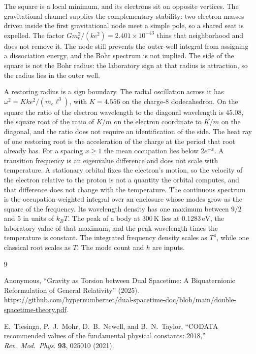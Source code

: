 \documentclass[a4paper]{article}
\begin{document}
The square is a local minimum, and its electrons sit on opposite vertices. The gravitational channel supplies the complementary stability: two electron masses driven inside the first gravitational node meet a simple pole, so a shared seat is expelled. The factor \(G m_e^{2}/(k e^{2})=2.401\times 10^{-43}\) thins that neighborhood and does not remove it. The node still prevents the outer-well integral from assigning a dissociation energy, and the Bohr spectrum is not implied. The side of the square is not the Bohr radius: the laboratory sign at that radius is attraction, so the radius lies in the outer well.

A restoring radius is a sign boundary. The radial oscillation across it has \(\omega^{2}=K k e^{2}/(m_e\ell^{3})\), with \(K=4.556\) on the charge-\(8\) dodecahedron. On the square the ratio of the electron wavelength to the diagonal wavelength is \(45.08\), the square root of the ratio of \(K/m\) on the electron coordinate to \(K/m\) on the diagonal, and the ratio does not require an identification of the side. The heat ray of one restoring root is the acceleration of the charge at the period that root already has. For a spacing \(x\ge 1\) the mean occupation lies below \(2e^{-x}\). A transition frequency is an eigenvalue difference and does not scale with temperature. A stationary orbital fixes the electron's motion, so the velocity of the electron relative to the proton is not a quantity the orbital computes, and that difference does not change with the temperature. The continuous spectrum is the occupation-weighted integral over an enclosure whose modes grow as the square of the frequency. Its wavelength density has one maximum between \(9/2\) and \(5\) in units of \(k_B T\). The peak of a body at \(300\,\mathrm{K}\) lies at \(0.1283\,\mathrm{eV}\), the laboratory value of that maximum, and the peak wavelength times the temperature is constant. The integrated frequency density scales as \(T^{4}\), while one classical root scales as \(T\). The mode count and \(h\) are inputs.

\begin{thebibliography}{9}

Anonymous,
``Gravity as Torsion between Dual Spacetime: A Biquaternionic Reformulation of General Relativity'' (2025).
\url{https://github.com/hypernumbernet/dual-spacetime-doc/blob/main/double-spacetime-theory.pdf}.

E.~Tiesinga, P.~J.~Mohr, D.~B.~Newell, and B.~N.~Taylor,
``CODATA recommended values of the fundamental physical constants: 2018,''
\textit{Rev.\ Mod.\ Phys.} \textbf{93}, 025010 (2021).

\end{thebibliography}
\end{document}
